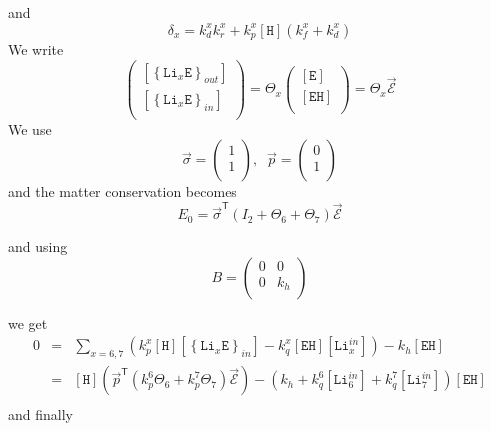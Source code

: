 \documentclass[aps,onecolumn,11pt]{revtex4}
\newcommand{\mychem}[1]{\mathtt{#1}}
\newcommand{\myconc}[1]{\left\lbrack{#1}\right\rbrack}
\newcommand{\LiEin}[1]{\myconc{\left\lbrace\mychem{Li}_{#1}\mychem{E}\right\rbrace_{in}}}
\newcommand{\LiEout}[1]{\myconc{\left\lbrace\mychem{Li}_{#1}\mychem{E}\right\rbrace_{out}}}
\newcommand{\LiIn}[1]{\myconc{\mychem{Li}_{#1}^{in}}}
\newcommand{\EHin}{\myconc{\mychem{EH}}}
\newcommand{\Eout}{\myconc{\mychem{E}}}
\newcommand{\Hin}{\myconc{\mychem{H}}}
\newcommand{\mytrn}[1]{{#1}^{\mathsf{T}}}
\begin{document}
and
\begin{equation}
\delta_x = k_d^x k_r^x + k_p^x \Hin \left(k_f^x+k_d^x\right)
\end{equation}
We write
\begin{equation}
	\begin{pmatrix}
	\LiEout{x}\\
	\LiEin{x}\\
\end{pmatrix}
= 
\Theta_x 
\begin{pmatrix}
	\Eout\\
	\EHin\\
\end{pmatrix}
=\Theta_x \vec{\mathcal{E}}
\end{equation}
We use 
\begin{equation}
	\vec{\sigma} = 
	\begin{pmatrix}
	1\\
	1\\
	\end{pmatrix}, \;\; 
	\vec{p} = 
	\begin{pmatrix}
	0\\
	1\\
	\end{pmatrix}
\end{equation}
and the matter conservation becomes
\begin{equation}
	E_0 = \mytrn{\vec{\sigma}}\left(I_2+\Theta_6+\Theta_7\right) \vec{\mathcal{E}}
\end{equation}

and using
\begin{equation}
	B = 
	\begin{pmatrix}
	0 & 0\\
	0 & k_h\\
	\end{pmatrix}
\end{equation}

we get
\begin{equation}
	\begin{array}{rcl}
		0 & = & \sum_{x=6,7}\left( k_p^x \Hin \LiEin{x} - k_q^x \EHin \LiIn{x}\right) - k_h \EHin\\
		  & = &
			\Hin \left(
			\mytrn{\vec{p}} 
			\left(
			k_p^6\Theta_6 + k_p^7 \Theta_7
			\right)
			\vec{\mathcal{E}}
			\right)
			-\left(k_h + k_q^6 \LiIn{6} + k_q^7 \LiIn{7} \right) \EHin
		  \\
	\end{array}
\end{equation}
and finally
\end{document}
